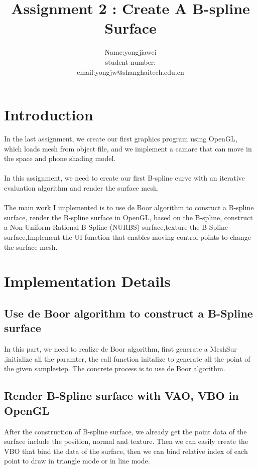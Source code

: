 \documentclass[acmtog]{acmart}
\title{Assignment 2 : Create A B-spline Surface}
\author{Name:\quad yongjiawei  \\ student number:\quad 2019533095
	\\email:\quad yongjw@shanghaitech.edu.cn}
\begin{document}
\maketitle

\vspace*{2 ex}


\section{Introduction}
In the last assignment, we create our first graphics program using OpenGL, which loads mesh from object file, and we implement a camare that can move in the space and phone shading model.
\\\\ In this assignment, we need to create our first B-spline curve with an iterative evaluation algorithm and render the surface mesh.
\\\\The main work I implemented is to use de Boor algorithm to consruct a B-spline surface, render the B-spline surface in OpenGL, based on the B-spline, construct a Non-Uniform Rational B-Spline (NURBS) surface,texture the B-Spline surface,Implement the UI function that enables moving control points to change the surface mesh.\label{key}

\section{Implementation Details}
\subsection{Use de Boor algorithm to construct a B-Spline surface }
In this part, we need to realize de Boor algorithm, first generate a MeshSur ,initialize all the paramter, the call function initalize to generate all the point of the given samplestep. The concrete process is to use de Boor algorithm.
\subsection{Render B-Spline surface with VAO, VBO in OpenGL}
After the construction of B-spline surface, we already get the point data of the surface include the position, normal and texture. Then we can easily create the VBO that bind the data of the surface, then we can bind relative index of each point to draw in triangle mode or in line mode.
\end{document}
